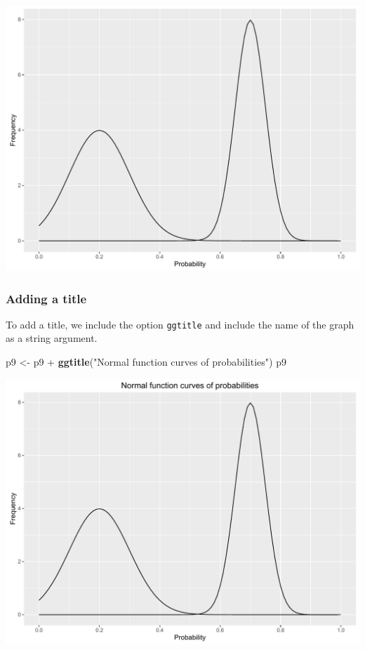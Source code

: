 \documentclass[]{article}
\newenvironment{Shaded}{\begin{snugshade}}{\end{snugshade}}
\newcommand{\KeywordTok}[1]{\textcolor[rgb]{0.13,0.29,0.53}{\textbf{{#1}}}}
\newcommand{\StringTok}[1]{\textcolor[rgb]{0.31,0.60,0.02}{{#1}}}
\newcommand{\NormalTok}[1]{{#1}}
\begin{document}
\begin{center}\includegraphics{0_all_posts_pdf/function_6-1} \end{center}

\subsubsection{Adding a title}\label{adding-a-title-2}

To add a title, we include the option \texttt{ggtitle} and include the
name of the graph as a string argument.

\begin{Shaded}
\begin{Highlighting}[]
\NormalTok{p9 <-}\StringTok{ }\NormalTok{p9 +}\StringTok{ }\KeywordTok{ggtitle}\NormalTok{(}\StringTok{"Normal function curves of probabilities"}\NormalTok{)}
\NormalTok{p9}
\end{Highlighting}
\end{Shaded}

\begin{center}\includegraphics{0_all_posts_pdf/function_7-1} \end{center}
\end{document}
